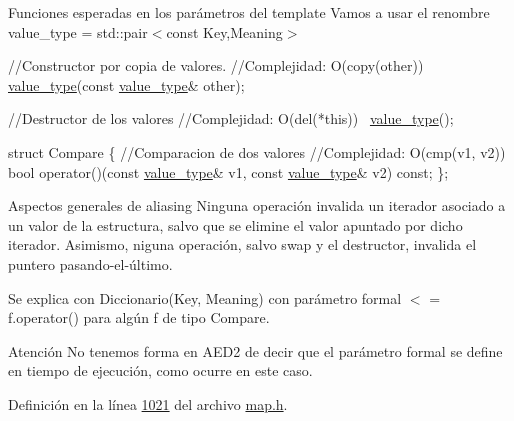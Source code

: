 \begin{DoxyParagraph}{Funciones esperadas en los parámetros del template}
Vamos a usar el renombre value\+\_\+type = std\+::pair$<$const Key,\+Meaning$>$


\begin{DoxyCode}
\textcolor{comment}{//Constructor por copia de valores.}
\textcolor{comment}{//Complejidad: O(copy(other))}
\hyperlink{classaed2_1_1map_a719db98e0ff9a837610f76be33264680_a719db98e0ff9a837610f76be33264680}{value\_type}(\textcolor{keyword}{const} \hyperlink{classaed2_1_1map_a719db98e0ff9a837610f76be33264680_a719db98e0ff9a837610f76be33264680}{value\_type}& other);

\textcolor{comment}{//Destructor de los valores}
\textcolor{comment}{//Complejidad: O(del(*this))}
~\hyperlink{classaed2_1_1map_a719db98e0ff9a837610f76be33264680_a719db98e0ff9a837610f76be33264680}{value\_type}();

\textcolor{keyword}{struct }Compare \{
  \textcolor{comment}{//Comparacion de dos valores}
  \textcolor{comment}{//Complejidad: O(cmp(v1, v2))}
  \textcolor{keywordtype}{bool} operator()(\textcolor{keyword}{const} \hyperlink{classaed2_1_1map_a719db98e0ff9a837610f76be33264680_a719db98e0ff9a837610f76be33264680}{value\_type}& v1, \textcolor{keyword}{const} \hyperlink{classaed2_1_1map_a719db98e0ff9a837610f76be33264680_a719db98e0ff9a837610f76be33264680}{value\_type}& v2) \textcolor{keyword}{const};
\};
\end{DoxyCode}
 
\end{DoxyParagraph}


\begin{DoxyParagraph}{Aspectos generales de aliasing}
Ninguna operación invalida un iterador asociado a un valor de la estructura, salvo que se elimine el valor apuntado por dicho iterador. Asimismo, niguna operación, salvo swap y el destructor, invalida el puntero pasando-\/el-\/último.
\end{DoxyParagraph}
\begin{DoxyParagraph}{Se explica con}
Diccionario(Key, Meaning) con parámetro formal $<$ = f.\+operator() para algún f de tipo Compare.
\end{DoxyParagraph}
\begin{DoxyAttention}{Atención}
No tenemos forma en A\+E\+D2 de decir que el parámetro formal se define en tiempo de ejecución, como ocurre en este caso. 
\end{DoxyAttention}


Definición en la línea \hyperlink{map_8h_source_l01021}{1021} del archivo \hyperlink{map_8h_source}{map.\+h}.



